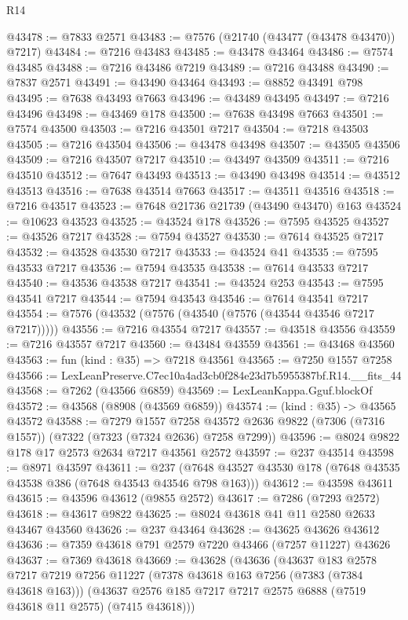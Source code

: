\begin{lexlean}{R14}
\begin{coremodule}
@43478 := @7833 @2571
@43483 := @7576 (@21740 (@43477 (@43478 @43470)) @7217)
@43484 := @7216 @43483
@43485 := @43478 @43464
@43486 := @7574 @43485
@43488 := @7216 @43486 @7219
@43489 := @7216 @43488
@43490 := @7837 @2571
@43491 := @43490 @43464
@43493 := @8852 @43491 @798
@43495 := @7638 @43493 @7663
@43496 := @43489 @43495
@43497 := @7216 @43496
@43498 := @43469 @178
@43500 := @7638 @43498 @7663
@43501 := @7574 @43500
@43503 := @7216 @43501 @7217
@43504 := @7218 @43503
@43505 := @7216 @43504
@43506 := @43478 @43498
@43507 := @43505 @43506
@43509 := @7216 @43507 @7217
@43510 := @43497 @43509
@43511 := @7216 @43510
@43512 := @7647 @43493
@43513 := @43490 @43498
@43514 := @43512 @43513
@43516 := @7638 @43514 @7663
@43517 := @43511 @43516
@43518 := @7216 @43517
@43523 := @7648 @21736 @21739 (@43490 @43470) @163
@43524 := @10623 @43523
@43525 := @43524 @178
@43526 := @7595 @43525
@43527 := @43526 @7217
@43528 := @7594 @43527
@43530 := @7614 @43525 @7217
@43532 := @43528 @43530 @7217
@43533 := @43524 @41
@43535 := @7595 @43533 @7217
@43536 := @7594 @43535
@43538 := @7614 @43533 @7217
@43540 := @43536 @43538 @7217
@43541 := @43524 @253
@43543 := @7595 @43541 @7217
@43544 := @7594 @43543
@43546 := @7614 @43541 @7217
@43554 := @7576 (@43532 (@7576 (@43540 (@7576 (@43544 @43546 @7217 @7217)))))
@43556 := @7216 @43554 @7217
@43557 := @43518 @43556
@43559 := @7216 @43557 @7217
@43560 := @43484 @43559
@43561 := @43468 @43560
@43563 := fun (kind : @35) => @7218 @43561
@43565 := @7250 @1557 @7258
@43566 := LexLeanPreserve.C7ec10a4ad3cb0f284e23d7b5955387bf.R14.__fits_44
@43568 := @7262 (@43566 @6859)
@43569 := LexLeanKappa.Gguf.blockOf
@43572 := @43568 (@8908 (@43569 @6859))
@43574 := (kind : @35) -> @43565 @43572
@43588 := @7279
    @1557
    @7258
    @43572
    @2636
    @9822
    (@7306 (@7316 @1557))
    (@7322 (@7323 (@7324 @2636) @7258 @7299))
@43596 := @8024 @9822 @178 @17 @2573 @2634 @7217 @43561 @2572
@43597 := @237 @43514
@43598 := @8971 @43597
@43611 := @237 (@7648 @43527 @43530 @178 (@7648 @43535 @43538 @386 (@7648 @43543 @43546 @798 @163)))
@43612 := @43598 @43611
@43615 := @43596 @43612 (@9855 @2572)
@43617 := @7286 (@7293 @2572)
@43618 := @43617 @9822
@43625 := @8024 @43618 @41 @11 @2580 @2633 @43467 @43560
@43626 := @237 @43464
@43628 := @43625 @43626 @43612
@43636 := @7359 @43618 @791 @2579 @7220 @43466 (@7257 @11227) @43626
@43637 := @7369 @43618
@43669 := @43628
    (@43636
      (@43637
        @183
        @2578
        @7217
        @7219
        @7256
        @11227
        (@7378 @43618 @163 @7256 (@7383 (@7384 @43618 @163)))
        (@43637 @2576 @185 @7217 @7217 @2575 @6888 (@7519 @43618 @11 @2575) (@7415 @43618)))

\end{coremodule}
\end{lexlean}
